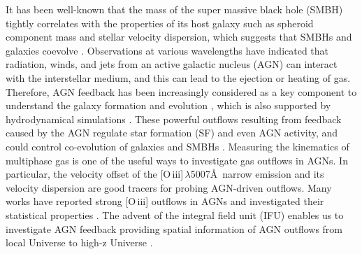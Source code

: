 \documentclass[twocolumn]{aastex6}
\begin{document}
It has been well-known that the mass of the super massive black hole (SMBH) tightly correlates with the properties of its host galaxy such as spheroid component mass and stellar velocity dispersion, which suggests that SMBHs and galaxies coevolve \citep[so-called ``co-evolution'': e.g.,][]{Magorrian,Marconi,Kormendy,McConnell,Sun,Woo_13}. 
Observations at various wavelengths have indicated that radiation, winds, and jets from an active galactic nucleus (AGN) can interact with the interstellar medium, and this can lead to the ejection or heating of gas.
Therefore, AGN feedback has been increasingly considered as a key component to understand the galaxy formation and evolution \cite[e.g.,][and references therein]{Fabian}, which is also supported by hydrodynamical simulations \cite[e.g.,][]{Wagner_11,Faucher-Giguere,Wagner_13,Bieri}.
These powerful outflows resulting from feedback caused by the AGN regulate star formation (SF) and even AGN activity, and could control co-evolution of galaxies and SMBHs \citep[e.g.,][]{Di,Cano-Diaz,King}.
Measuring the kinematics of multiphase gas is one of the useful ways to investigate gas outflows in AGNs. 
In particular, the velocity offset of the [O{\,\sc iii}]$\,\lambda$5007\AA \, narrow emission and its velocity dispersion are good tracers for probing AGN-driven outflows.
Many works have reported strong [O{\,\sc iii}] outflows in AGNs \cite[e.g.,][]{Zamanov,Aoki,Bian,Boroson, Komossa,Crenshaw,Greene,Villar,Rodriguez,Liu_a,Liu_b,Mullaney,Zakamska_14,Sun_17} and investigated their statistical properties \citep[e.g.,][]{Wang_a,Bae,Woo,Woo_17}.
The advent of the integral field unit (IFU) enables us to investigate AGN feedback providing spatial information of AGN outflows from local Universe \citep[e.g.,][]{Barbosa,Harrison,McElroy,Karouzos_16b,Karouzos_16b,Bae_17} to high-z Universe \citep[e.g.,][]{Alexander,Brusa,Carniani}.
\end{document}
